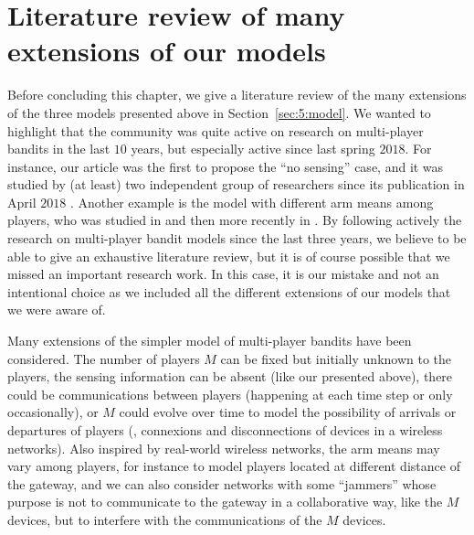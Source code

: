 


\section{Literature review of many extensions of our models}
\label{sec:5:literatureReviewOtherModels}

Before concluding this chapter, we give a literature review of the many extensions of the three models presented above in Section~\ref{sec:5:model}.
We wanted to highlight that the community was quite active on research on multi-player bandits in the last $10$ years, but especially active since last spring $2018$.
For instance, our article \cite{Besson2018ALT} was the first to propose the ``no sensing'' case, and it was studied by (at least) two independent group of researchers since its publication in April $2018$ \cite{BoursierPerchet18,LugosiMehrabian18}.
Another example is the model with different arm means among players, who was studied in \cite{Anandkumar10,Kalathil12} and then more recently in \cite{Bistritz18,KaufmannAbbas19}.
%
By following actively the research on multi-player bandit models since the last three years, we believe to be able to give an exhaustive literature review, but it is of course possible that we missed an important research work. In this case, it is our mistake and not an intentional choice as we included all the different extensions of our models that we were aware of.

Many extensions of the simpler model of multi-player bandits have been considered.
The number of players $M$ can be fixed but initially unknown to the players, the sensing information can be absent (like our \modeltrois{} presented above), there could be communications between players (happening at each time step or only occasionally), or $M$ could evolve over time to model the possibility of arrivals or departures of players (\ie, connexions and disconnections of devices in a wireless networks).
Also inspired by real-world wireless networks, the arm means may vary among players, for instance to model players located at different distance of the gateway, and we can also consider networks with some ``jammers'' whose purpose is not to communicate to the gateway in a collaborative way, like the $M$ devices, but to interfere with the communications of the $M$ devices.

